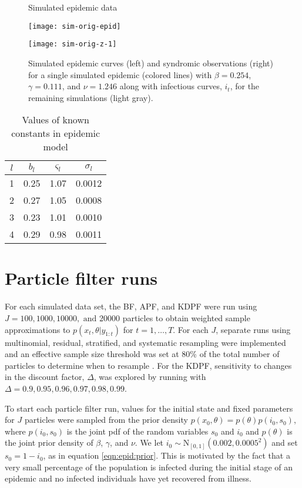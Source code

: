 \begin{figure}
\ssp
\centering
\caption{Simulated epidemic data} \label{fig:epid:data}
\begin{minipage}{0.48\linewidth}
\texttt{[image: sim-orig-epid]}
\end{minipage}
\begin{minipage}{0.48\linewidth}
\texttt{[image: sim-orig-z-1]}
\end{minipage}
\caption*{Simulated epidemic curves (left) and syndromic observations (right) for a single simulated epidemic (colored lines) with $\beta = 0.254$, $\gamma = 0.111$, and $\nu = 1.246$ along with infectious curves, $i_t$, for the remaining simulations (light gray).}
\end{figure}

\begin{table}
\ssp
\centering
\caption{Values of known constants in epidemic model} \label{tab:epid:constants}
\begin{tabular}{|cccc|}
\hline
$l$ & $b_l$ & $\varsigma_l$ & $\sigma_l$ \\
\hline
1 & 0.25 & 1.07 & 0.0012 \\
2 & 0.27 & 1.05 & 0.0008 \\
3 & 0.23 & 1.01 & 0.0010 \\
4 & 0.29 & 0.98 & 0.0011 \\
\hline
\end{tabular}
\end{table}

\section{Particle filter runs} \label{sec:pf}

For each simulated data set, the BF, APF, and KDPF were run using $J = 100, 1000, 10000, \mbox{ and } 20000$ particles to obtain weighted sample approximations to $p(x_t,\theta|y_{1:t})$ for $t = 1,\ldots,T$. For each $J$, separate runs using multinomial, residual, stratified, and systematic resampling were implemented \citep{smcUtils} and an effective sample size threshold was set at 80\% of the total number of particles to determine when to resample \citep{Liu:Chen:Wong:reje:1998}. For the KDPF, sensitivity to changes in the discount factor, $\Delta$, was explored by running with $\Delta = 0.9, 0.95, 0.96, 0.97, 0.98, 0.99$.

To start each particle filter run, values for the initial state and fixed parameters for $J$ particles were sampled from the prior density $p(x_0,\theta) = p(\theta)p(i_0,s_0)$, where $p(i_0,s_0)$ is the joint pdf of the random variables $s_0$ and $i_0$ and $p(\theta)$ is the joint prior density of $\beta$, $\gamma$, and $\nu$. We let $i_0 \sim \mbox{N}_{[0,1]}(0.002,0.0005^2)$ and set $s_0 = 1 - i_0$, as in equation \eqref{eqn:epid:prior}. This is motivated by the fact that a very small percentage of the population is infected during the initial stage of an epidemic and no infected individuals have yet recovered from illness.


